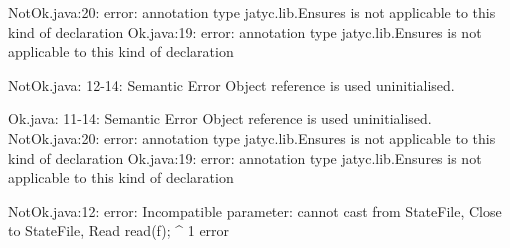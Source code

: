 \lstset{language=,caption=Mungo's output}
\begin{code}
NotOk.java:20: error: annotation type jatyc.lib.Ensures is not applicable to this kind of declaration
Ok.java:19: error: annotation type jatyc.lib.Ensures is not applicable to this kind of declaration

NotOk.java: 12-14: Semantic Error
		Object reference is used uninitialised.

Ok.java: 11-14: Semantic Error
		Object reference is used uninitialised.
NotOk.java:20: error: annotation type jatyc.lib.Ensures is not applicable to this kind of declaration
Ok.java:19: error: annotation type jatyc.lib.Ensures is not applicable to this kind of declaration
\end{code}

\lstset{language=,caption=Our tool's output}
\begin{code}
NotOk.java:12: error: Incompatible parameter: cannot cast from State{File, Close} to State{File, Read}
        read(f);
             ^
1 error
\end{code}

